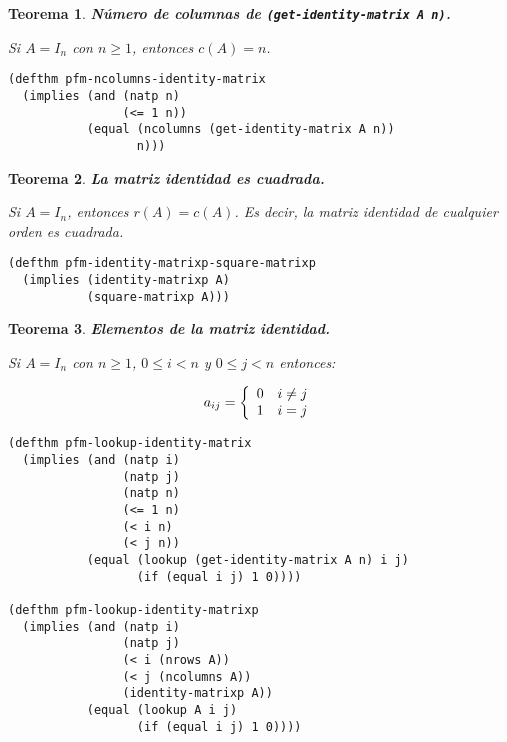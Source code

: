 \documentclass[a4paper,10pt]{article}
\newtheorem{teor}{{Teorema}}
\begin{document}
\par \vspace{16pt}

\begin{teor} \textbf{Número de columnas de \texttt{(get-identity-matrix A n)}.}\vspace{8pt}\par
Si $A=I_n$ con $n\geq 1$, entonces $c(A) = n$.
\end{teor}

\begin{lstlisting}[language=clips]
(defthm pfm-ncolumns-identity-matrix
  (implies (and (natp n)
                (<= 1 n))
           (equal (ncolumns (get-identity-matrix A n)) 
                  n)))
\end{lstlisting}

\par \vspace{16pt}

\begin{teor} \textbf{La matriz identidad es cuadrada.}\vspace{8pt}\par
Si $A=I_n$, entonces $r(A) = c(A)$. Es decir, la matriz identidad de cualquier orden es \emph{cuadrada}. 
\end{teor}

\begin{lstlisting}[language=clips]
(defthm pfm-identity-matrixp-square-matrixp
  (implies (identity-matrixp A)
           (square-matrixp A)))
\end{lstlisting}

\par \vspace{16pt}

\begin{teor} \textbf{Elementos de la matriz identidad.}\vspace{8pt}\par
Si $A=I_n$ con $n\geq 1$, $0 \leq i < n$ y $0 \leq j < n$ entonces:

$$
a_{ij} = \left\{\begin{array}{c l} 0 & i \neq j\\ 1 & i = j\end{array}\right.
$$

\end{teor}

\begin{lstlisting}[language=clips]
(defthm pfm-lookup-identity-matrix
  (implies (and (natp i)
                (natp j)
                (natp n)
                (<= 1 n)
                (< i n)
                (< j n))
           (equal (lookup (get-identity-matrix A n) i j) 
                  (if (equal i j) 1 0))))
									
(defthm pfm-lookup-identity-matrixp
  (implies (and (natp i)
                (natp j)
                (< i (nrows A))
                (< j (ncolumns A))
                (identity-matrixp A))
           (equal (lookup A i j)
                  (if (equal i j) 1 0))))
\end{lstlisting}
\end{document}
